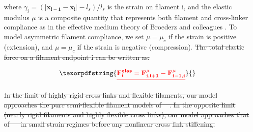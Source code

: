 \documentclass[10pt,letterpaper]{article}
\providecommand{\DIFaddtex}[1]{{\protect\color{blue}\uwave{#1}}} %
\providecommand{\DIFdeltex}[1]{{\protect\color{red}\sout{#1}}}                      %
\providecommand{\DIFaddbegin}{} %
\providecommand{\DIFaddend}{} %
\providecommand{\DIFdelbegin}{} %
\providecommand{\DIFdelend}{} %
\providecommand{\DIFadd}[1]{\texorpdfstring{\DIFaddtex{#1}}{#1}} %
\providecommand{\DIFdel}[1]{\texorpdfstring{\DIFdeltex{#1}}{}} %
\begin{document}
where \DIFdelbegin \DIFdel{$ \gamma_{i} = (|\mathbf{x_{i-1}}-\mathbf{x_i}|-l_s)/l_s$ }\DIFdelend \DIFaddbegin \DIFadd{$ \gamma_{i} = (|\mathbf{x_{i+1}}-\mathbf{x_i}|-l_s)/l_s$ }\DIFaddend is the strain on filament i, and the elastic modulus  $\mu$ is a composite quantity that represents both filament and cross-linker compliance as in the effective medium theory of Broederz and colleagues \cite{theo_crosslinknonlinear}.  To model asymmetric filament compliance, we set $\mu = \mu_e$ if the strain is positive (extension), and $\mu = \mu_c$ if the strain is negative (compression). 
\DIFdelbegin \DIFdel{The total elastic force on a filament endpoint $\mathbf{i}$ can be written as:
}%

\begin{displaymath}
\DIFdel{%
\mathbf{F^{elas}_i} =  \mathbf{F^{\mu}_{i,i+1}} - \mathbf{F^{\mu}_{i-1,i}} 
}\end{displaymath}

\DIFdel{In the limit of highly rigid cross-links and flexible filaments, our model approaches the pure semi-flexible filament models of \mbox{%
\cite{theo_hlm,theo_hlm2}}%
. In the opposite limit (nearly rigid filaments and highly flexible cross links), our model approaches that of \mbox{%
\cite{theo_crosslinknonlinear} }%
in small strain regimes before any nonlinear cross link stiffening. 
}\DIFdelend 
\end{document}
